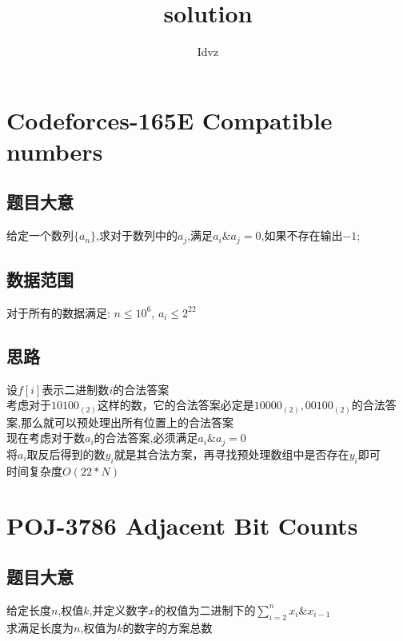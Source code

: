 \documentclass{ctexart}
\title{solution}
\author{Idvz}
\numberwithin{equation}{section}
\begin{document}
\date{}
\maketitle


\newpage

\setcounter{tocdepth}{1}
\tableofcontents


\newpage

\begin{flushleft}
  \section{Codeforces-165E Compatible numbers}
  \subsection{题目大意}
  给定一个数列$\{a_n\}$,求对于数列中的$a_j$,满足$a_i\&a_j=0$,如果不存在输出$-1$; \\
  \subsection{数据范围}
  对于所有的数据满足: $n \le 10^6$, $a_i \le 2^{22}$ \\
  \subsection{思路}
  设$f[i]$表示二进制数$i$的合法答案\\
  考虑对于$10100_{(2)}$这样的数，它的合法答案必定是$10000_{(2)},00100_{(2)}$的合法答案,那么就可以预处理出所有位置上的合法答案 \\
  现在考虑对于数$a_i$的合法答案,必须满足$a_i \&a_j=0$ \\
  将$a_i$取反后得到的数$y_i$就是其合法方案，再寻找预处理数组中是否存在$y_i$即可 \\
  时间复杂度$O(22*N)$

  \newpage

  \section{POJ-3786 Adjacent Bit Counts}
  \subsection{题目大意}
  给定长度$n$,权值$k$,并定义数字$x$的权值为二进制下的$\sum_{i=2}^{n}x_i\&x_{i-1}$ \\
  求满足长度为$n$,权值为$k$的数字的方案总数 \\

\end{flushleft}
\end{document}
